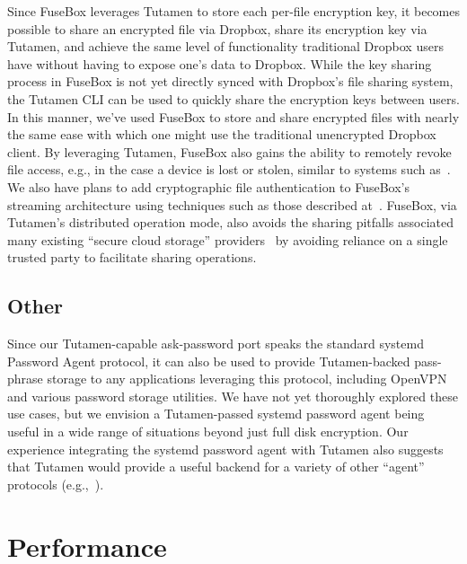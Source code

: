 Since FuseBox leverages Tutamen to store each per-file encryption key,
it becomes possible to share an encrypted file via Dropbox, share its
encryption key via Tutamen, and achieve the same level of
functionality traditional Dropbox users have without having to expose
one's data to Dropbox. While the key sharing process in FuseBox is not
yet directly synced with Dropbox's file sharing system, the Tutamen
CLI can be used to quickly share the encryption keys between users. In
this manner, we've used FuseBox to store and share encrypted files
with nearly the same ease with which one might use the traditional
unencrypted Dropbox client. By leveraging Tutamen, FuseBox also gains
the ability to remotely revoke file access, e.g., in the case a device
is lost or stolen, similar to systems such as~\cite{geambasu2011}. We
also have plans to add cryptographic file authentication to FuseBox's
streaming architecture using techniques such as those described
at~\cite{McGrew2005}. FuseBox, via Tutamen's distributed operation
mode, also avoids the sharing pitfalls associated many existing
``secure cloud storage'' providers~\cite{wilson2014} by avoiding
reliance on a single trusted party to facilitate sharing operations.

\subsection{Other}

Since our Tutamen-capable ask-password port speaks the standard
systemd Password Agent protocol, it can also be used to provide
Tutamen-backed pass-phrase storage to any applications leveraging this
protocol, including OpenVPN and various password storage utilities. We
have not yet thoroughly explored these use cases, but we envision a
Tutamen-passed systemd password agent being useful in a wide range of
situations beyond just full disk encryption. Our experience
integrating the systemd password agent with Tutamen also suggests that
Tutamen would provide a useful backend for a variety of other
``agent'' protocols (e.g.,~\cite{cox2002, ylonen1996}).

\section{Performance}
\label{chap:tutamen:performace}

